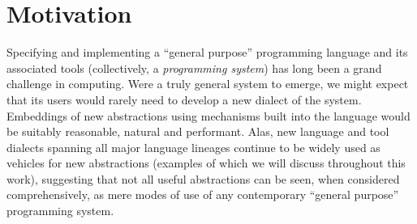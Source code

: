 \vspace{-25pt}
\section{Motivation}\label{motivation}
Specifying and implementing a ``general purpose'' programming language and its associated tools (collectively, a \emph{programming system}) has long been a grand challenge in computing. Were a truly general system to emerge, we might expect that its users would rarely  need to develop a new dialect of the system. Embeddings of new abstractions using mechanisms built into the language would be suitably reasonable, natural and performant. Alas, new language and tool dialects spanning all major language lineages continue to be widely used as vehicles for new abstractions (examples of which we will discuss throughout this work), suggesting that not all useful  abstractions can be seen, when considered comprehensively, as mere modes of use of any contemporary ``general purpose'' programming system.%


